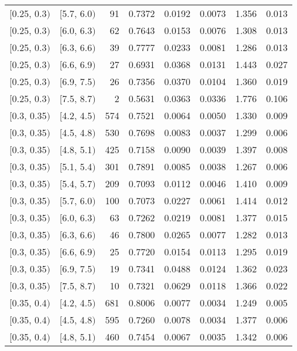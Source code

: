 \begin{longtable}{| l | l | r | r | r | r | r | r |}
        $[$0.25, 0.3$)$ & $[$5.7, 6.0$)$ & 91 & 0.7372 & 0.0192 & 0.0073 & 1.356 & 0.013 \\
        $[$0.25, 0.3$)$ & $[$6.0, 6.3$)$ & 62 & 0.7643 & 0.0153 & 0.0076 & 1.308 & 0.013 \\
        $[$0.25, 0.3$)$ & $[$6.3, 6.6$)$ & 39 & 0.7777 & 0.0233 & 0.0081 & 1.286 & 0.013 \\
        $[$0.25, 0.3$)$ & $[$6.6, 6.9$)$ & 27 & 0.6931 & 0.0368 & 0.0131 & 1.443 & 0.027 \\
        $[$0.25, 0.3$)$ & $[$6.9, 7.5$)$ & 26 & 0.7356 & 0.0370 & 0.0104 & 1.360 & 0.019 \\
        $[$0.25, 0.3$)$ & $[$7.5, 8.7$)$ & 2 & 0.5631 & 0.0363 & 0.0336 & 1.776 & 0.106 \\
        $[$0.3, 0.35$)$ & $[$4.2, 4.5$)$ & 574 & 0.7521 & 0.0064 & 0.0050 & 1.330 & 0.009 \\
        $[$0.3, 0.35$)$ & $[$4.5, 4.8$)$ & 530 & 0.7698 & 0.0083 & 0.0037 & 1.299 & 0.006 \\
        $[$0.3, 0.35$)$ & $[$4.8, 5.1$)$ & 425 & 0.7158 & 0.0090 & 0.0039 & 1.397 & 0.008 \\
        $[$0.3, 0.35$)$ & $[$5.1, 5.4$)$ & 301 & 0.7891 & 0.0085 & 0.0038 & 1.267 & 0.006 \\
        $[$0.3, 0.35$)$ & $[$5.4, 5.7$)$ & 209 & 0.7093 & 0.0112 & 0.0046 & 1.410 & 0.009 \\
        $[$0.3, 0.35$)$ & $[$5.7, 6.0$)$ & 100 & 0.7073 & 0.0227 & 0.0061 & 1.414 & 0.012 \\
        $[$0.3, 0.35$)$ & $[$6.0, 6.3$)$ & 63 & 0.7262 & 0.0219 & 0.0081 & 1.377 & 0.015 \\
        $[$0.3, 0.35$)$ & $[$6.3, 6.6$)$ & 46 & 0.7800 & 0.0265 & 0.0077 & 1.282 & 0.013 \\
        $[$0.3, 0.35$)$ & $[$6.6, 6.9$)$ & 25 & 0.7720 & 0.0154 & 0.0113 & 1.295 & 0.019 \\
        $[$0.3, 0.35$)$ & $[$6.9, 7.5$)$ & 19 & 0.7341 & 0.0488 & 0.0124 & 1.362 & 0.023 \\
        $[$0.3, 0.35$)$ & $[$7.5, 8.7$)$ & 10 & 0.7321 & 0.0629 & 0.0118 & 1.366 & 0.022 \\
        $[$0.35, 0.4$)$ & $[$4.2, 4.5$)$ & 681 & 0.8006 & 0.0077 & 0.0034 & 1.249 & 0.005 \\
        $[$0.35, 0.4$)$ & $[$4.5, 4.8$)$ & 595 & 0.7260 & 0.0078 & 0.0034 & 1.377 & 0.006 \\
        $[$0.35, 0.4$)$ & $[$4.8, 5.1$)$ & 460 & 0.7454 & 0.0067 & 0.0035 & 1.342 & 0.006 \\

\end{longtable}
